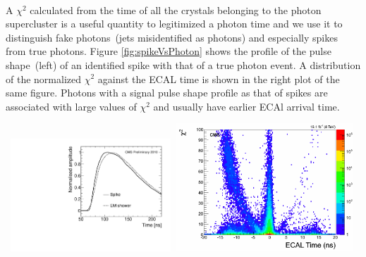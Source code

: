 \paragraph*{}
  A $\chi^{2}$ calculated from the time of all the crystals belonging to the photon supercluster is a useful quantity to legitimized a photon time and we use it to distinguish fake photons~(jets misidentified as photons) and especially spikes from true photons. Figure  \ref{fig:spikeVsPhoton} shows the profile of the pulse shape~(left) of an identified spike with that of a true photon event. A distribution of the normalized $\chi^{2}$ against the ECAL time is shown in the right plot of the same figure. Photons with a signal pulse shape profile as that of spikes are associated with large values of $\chi^{2}$ and usually have earlier ECAl arrival time.
 
 \vspace{5mm}
\begin{minipage}{0.90\linewidth} 
\begin{center}
\mbox{
\includegraphics[height=.450\textwidth, width=0.45\textwidth]{THESISPLOTS/spike_pulse_shape.pdf}
\includegraphics[height=.450\textwidth, width=0.5\textwidth]{THESISPLOTS/seedTime_Chi2.png} }
\label{fig:spikeVsPhoton}
\end{center}
\end{minipage}

